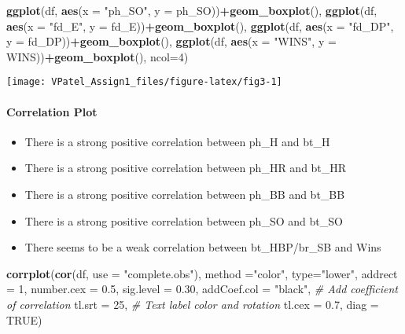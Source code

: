 \documentclass[]{article}
\newenvironment{Shaded}{\begin{snugshade}}{\end{snugshade}}
\newcommand{\CommentTok}[1]{\textcolor[rgb]{0.56,0.35,0.01}{\textit{#1}}}
\newcommand{\DataTypeTok}[1]{\textcolor[rgb]{0.13,0.29,0.53}{#1}}
\newcommand{\DecValTok}[1]{\textcolor[rgb]{0.00,0.00,0.81}{#1}}
\newcommand{\FloatTok}[1]{\textcolor[rgb]{0.00,0.00,0.81}{#1}}
\newcommand{\KeywordTok}[1]{\textcolor[rgb]{0.13,0.29,0.53}{\textbf{#1}}}
\newcommand{\NormalTok}[1]{#1}
\newcommand{\OperatorTok}[1]{\textcolor[rgb]{0.81,0.36,0.00}{\textbf{#1}}}
\newcommand{\OtherTok}[1]{\textcolor[rgb]{0.56,0.35,0.01}{#1}}
\newcommand{\StringTok}[1]{\textcolor[rgb]{0.31,0.60,0.02}{#1}}
\providecommand{\tightlist}{%
  \setlength{\itemsep}{0pt}\setlength{\parskip}{0pt}}
\let\oldparagraph\paragraph
\renewcommand{\paragraph}[1]{\oldparagraph{#1}\mbox{}}
\begin{document}
\begin{Shaded}
\begin{Highlighting}[]
             \KeywordTok{ggplot}\NormalTok{(df, }\KeywordTok{aes}\NormalTok{(}\DataTypeTok{x =} \StringTok{"ph_SO"}\NormalTok{, }\DataTypeTok{y =}\NormalTok{ ph_SO))}\OperatorTok{+}\KeywordTok{geom_boxplot}\NormalTok{(),}
             \KeywordTok{ggplot}\NormalTok{(df, }\KeywordTok{aes}\NormalTok{(}\DataTypeTok{x =} \StringTok{"fd_E"}\NormalTok{, }\DataTypeTok{y =}\NormalTok{ fd_E))}\OperatorTok{+}\KeywordTok{geom_boxplot}\NormalTok{(),}
             \KeywordTok{ggplot}\NormalTok{(df, }\KeywordTok{aes}\NormalTok{(}\DataTypeTok{x =} \StringTok{"fd_DP"}\NormalTok{, }\DataTypeTok{y =}\NormalTok{ fd_DP))}\OperatorTok{+}\KeywordTok{geom_boxplot}\NormalTok{(),}
             \KeywordTok{ggplot}\NormalTok{(df, }\KeywordTok{aes}\NormalTok{(}\DataTypeTok{x =} \StringTok{"WINS"}\NormalTok{, }\DataTypeTok{y =}\NormalTok{ WINS))}\OperatorTok{+}\KeywordTok{geom_boxplot}\NormalTok{(),}
             \DataTypeTok{ncol=}\DecValTok{4}\NormalTok{)}
\end{Highlighting}
\end{Shaded}

\begin{center}\texttt{[image: VPatel\_Assign1\_files/figure-latex/fig3-1]} \end{center}

\hypertarget{correlation-plot}{%
\paragraph{Correlation Plot}\label{correlation-plot}}

\begin{itemize}
\tightlist
\item
  There is a strong positive correlation between ph\_H and bt\_H
\item
  There is a strong positive correlation between ph\_HR and bt\_HR
\item
  There is a strong positive correlation between ph\_BB and bt\_BB
\item
  There is a strong positive correlation between ph\_SO and bt\_SO
\item
  There seems to be a weak correlation between bt\_HBP/br\_SB and Wins
\end{itemize}

\begin{Shaded}
\begin{Highlighting}[]
\KeywordTok{corrplot}\NormalTok{(}\KeywordTok{cor}\NormalTok{(df, }\DataTypeTok{use =} \StringTok{"complete.obs"}\NormalTok{), }\DataTypeTok{method =}\StringTok{"color"}\NormalTok{, }\DataTypeTok{type=}\StringTok{"lower"}\NormalTok{, }\DataTypeTok{addrect =} \DecValTok{1}\NormalTok{, }\DataTypeTok{number.cex =} \FloatTok{0.5}\NormalTok{, }\DataTypeTok{sig.level =} \FloatTok{0.30}\NormalTok{,}
         \DataTypeTok{addCoef.col =} \StringTok{"black"}\NormalTok{, }\CommentTok{# Add coefficient of correlation}
         \DataTypeTok{tl.srt =} \DecValTok{25}\NormalTok{, }\CommentTok{# Text label color and rotation}
         \DataTypeTok{tl.cex =} \FloatTok{0.7}\NormalTok{,}
         \DataTypeTok{diag =} \OtherTok{TRUE}\NormalTok{)}
\end{Highlighting}
\end{Shaded}
\end{document}
